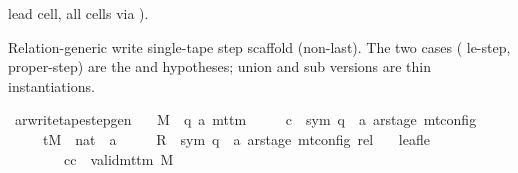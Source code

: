 \begin{isabellebody}
\begin{isamarkuptext}
  lead cell, all  cells via
  ).%
\end{isamarkuptext}\isamarkuptrue%
%
\begin{isamarkuptext}%
Relation-generic write single-tape step scaffold (non-last).
  The two cases ( le-step,  proper-step)
  are the  and  hypotheses; union and
  sub versions are thin instantiations.%
\end{isamarkuptext}\isamarkuptrue%
\isamarkupfalse%
\ ar{\isacharunderscore}{\kern0pt}write{\isacharunderscore}{\kern0pt}tape{\isacharunderscore}{\kern0pt}step{\isacharunderscore}{\kern0pt}gen{\isacharcolon}{\kern0pt}\isanewline
\ \ \ M\ {\isacharcolon}{\kern0pt}{\isacharcolon}{\kern0pt}\ {\isachardoublequoteopen}{\isacharparenleft}{\kern0pt}{\isacharprime}{\kern0pt}q{\isacharcomma}{\kern0pt}\ {\isacharprime}{\kern0pt}a{\isacharparenright}{\kern0pt}\ mttm{\isachardoublequoteclose}\isanewline
\ \ \ \ \ c{\isacharprime}{\kern0pt}\ {\isacharcolon}{\kern0pt}{\isacharcolon}{\kern0pt}\ {\isachardoublequoteopen}{\isacharparenleft}{\kern0pt}sym{}{\isacharcomma}{\kern0pt}\ {\isacharprime}{\kern0pt}q\ {\isasymtimes}\ {\isacharprime}{\kern0pt}a\ ar{\isacharunderscore}{\kern0pt}stage{\isacharparenright}{\kern0pt}\ mt{\isacharunderscore}{\kern0pt}config{\isachardoublequoteclose}\isanewline
\ \ \ \ \ tM\ {\isacharcolon}{\kern0pt}{\isacharcolon}{\kern0pt}\ {\isachardoublequoteopen}nat\ {\isasymRightarrow}\ {\isacharprime}{\kern0pt}a{\isachardoublequoteclose}\isanewline
\ \ \ \ \ R{\isacharprime}{\kern0pt}\ {\isacharcolon}{\kern0pt}{\isacharcolon}{\kern0pt}\ {\isachardoublequoteopen}{\isacharparenleft}{\kern0pt}sym{}{\isacharcomma}{\kern0pt}\ {\isacharprime}{\kern0pt}q\ {\isasymtimes}\ {\isacharprime}{\kern0pt}a\ ar{\isacharunderscore}{\kern0pt}stage{\isacharparenright}{\kern0pt}\ mt{\isacharunderscore}{\kern0pt}config\ rel{\isachardoublequoteclose}\isanewline
\ \ \ leaf{\isacharunderscore}{\kern0pt}le{\isacharcolon}{\kern0pt}\isanewline
\ \ \ \ \ \ \ \ {\isachardoublequoteopen}{\isasymAnd}cc{\isachardot}{\kern0pt}\ {\isasymlbrakk}\ valid{\isacharunderscore}{\kern0pt}mttm\ M{\isacharsemicolon}{\kern0pt}\isanewline

\end{isabellebody}
